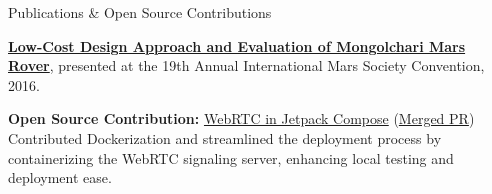 \documentclass{resume}
\begin{document}
    \begin{rSection}{Publications \& Open Source Contributions}
        \item \href{http://www.marspapers.org/paper/Sakib_2016.pdf}{\textbf{Low-Cost Design Approach and Evaluation of Mongolchari Mars Rover}}, presented at the 19th Annual International Mars Society Convention, 2016.

        \item \textbf{Open Source Contribution:} \href{https://github.com/GetStream/webrtc-in-jetpack-compose}{WebRTC in Jetpack Compose} (\href{https://github.com/GetStream/webrtc-in-jetpack-compose/pull/4}{Merged PR})\\
        Contributed Dockerization and streamlined the deployment process by containerizing the WebRTC signaling server, enhancing local testing and deployment ease.
    \end{rSection}
\end{document}
